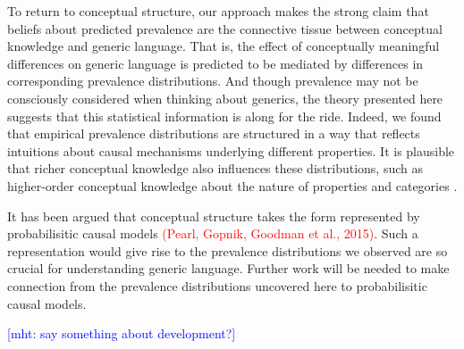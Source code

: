 \documentclass[12pt,letterpaper]{article}
\newcommand{\red}[1]{\textcolor{Red}{#1}}
\newcommand{\mht}[1]{\textcolor{Blue}{[mht: #1]}}
\begin{document}
To return to conceptual structure, our approach makes the strong claim that beliefs about predicted prevalence are the connective tissue between conceptual knowledge and generic language.
That is, the effect of conceptually meaningful differences on generic language is predicted to be mediated by differences in corresponding prevalence distributions.
And though prevalence may not be consciously considered when thinking about generics, the theory presented here suggests that this statistical information is along for the ride. 
Indeed, we found that empirical prevalence distributions are structured in a way that reflects intuitions about causal mechanisms underlying different properties.
It is plausible that richer conceptual knowledge also influences these distributions, such as higher-order conceptual knowledge about the nature of properties and categories \cite{Gelman2003,Keil1992}. 

It has been argued that conceptual structure takes the form represented by probabilisitic causal models \red{(Pearl, Gopnik, Goodman et al., 2015)}. 
Such a representation would give rise to the prevalence distributions we observed are so crucial for understanding generic language. 
Further work will be needed to make connection from the prevalence distributions uncovered here to probabilisitic causal models.

\mht{say something about development?}






%
\end{document}
